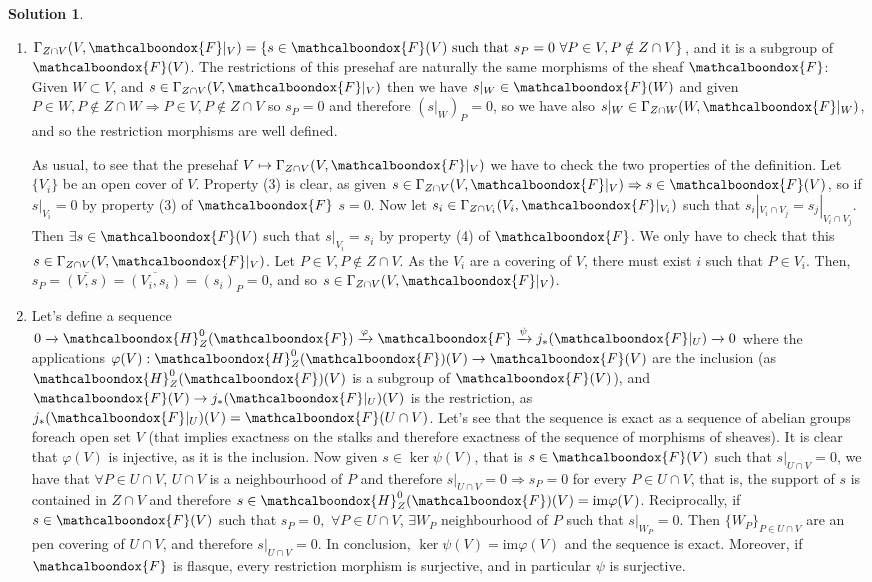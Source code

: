 \documentclass[12pt]{article}
\newcommand{\imp}{\ensuremath{\Rightarrow}}
\newcommand{\ima}{\ensuremath{\mathrm{im}}}
\theoremstyle{definition}
\newtheorem*{sol}{Solution}
\newcommand{\sF}{\ensuremath{\mathcalboondox{F}}}
\newcommand{\sH}{\ensuremath{\mathcalboondox{H}}}
\begin{document}
\begin{sol}
	\begin{enumerate}[label=\alph*)]
		\item $\Gamma_{Z \cap V} (V,\sF|_V) = \{s \in \sF(V) \text{ such that } s_P = 0 \, \, \forall P \in V, P \notin Z \cap V\}$, and it is a subgroup of $\sF(V)$. The restrictions of this presehaf are naturally the same morphisms of the sheaf $\sF$: Given $W \subset V$, and $s \in \Gamma_{Z \cap V} (V,\sF|_V)$ then we have $s|_W \in \sF(W)$ and given $P \in W, P \notin Z \cap W \imp P \in V, P \notin Z \cap V$ so $s_P = 0$ and therefore $(s|_W)_P = 0$, so we have also $s|_W \in \Gamma_{Z \cap W} (W,\sF|_W)$, and so the restriction morphisms are well defined. 

		As usual, to see that the presehaf $V \mapsto \Gamma_{Z \cap V} (V,\sF|_V)$ we have to check the two properties of the definition. Let $\{V_i\}$ be an open cover of $V$. Property (3) is clear, as given $s \in \Gamma_{Z \cap V} (V,\sF|_V) \imp s \in \sF(V)$, so if $s|_{V_i} = 0$ by property (3) of $\sF$ $s = 0$. Now let $s_i \in \Gamma_{Z \cap V_i} (V_i,\sF|_{V_i})$ such that $s_i|_{V_i \cap V_j} = s_j|_{V_i \cap V_j}$. Then $\exists s \in \sF(V)$ such that $s|_{V_i} = s_i$ by property (4) of $\sF$. We only have to check that this $s \in \Gamma_{Z \cap V} (V,\sF|_V)$. Let $P \in V, P \notin Z \cap V$. As the $V_i$ are a covering of $V$, there must exist $i$ such that $P \in V_i$. Then, $s_P = \overline{(V,s)} = \overline{(V_i, s_i)} = (s_i)_P = 0$, and so $s \in \Gamma_{Z \cap V}(V,\sF|_V)$.

		\item Let's define a sequence $0 \xrightarrow[]{} \sH_Z^0(\sF) \xrightarrow[]{\varphi} \sF \xrightarrow[]{\psi} j_*(\sF|_U) \xrightarrow[]{} 0$ where the applications $\varphi(V): \sH_Z^0(\sF)(V) \to \sF(V)$ are the inclusion (as $\sH_Z^0(\sF)(V)$ is a subgroup of $\sF(V)$), and $\sF(V) \to j_*(\sF|_U)(V)$ is the restriction, as $j_*(\sF|_U)(V) = \sF(U \cap V)$. Let's see that the sequence is exact as a sequence of abelian groups foreach open set $V$ (that implies exactness on the stalks and therefore exactness of the sequence of morphisms of sheaves). It is clear that $\varphi(V)$ is injective, as it is the inclusion. Now given $s \in \ker \psi(V)$, that is $s \in \sF(V)$ such that $s|_{U \cap V} = 0$, we have that $\forall P \in U \cap V$, $U \cap V$ is a neighbourhood of $P$ and therefore $s|_{U \cap V} = 0 \imp s_P = 0$ for every $P \in U \cap V$, that is, the support of $s$ is contained in $Z \cap V$ and therefore $s \in \sH^0_{Z}(\sF)(V) = \ima \varphi(V)$. Reciprocally, if $s \in \sF(V)$ such that $s_P = 0, \, \, \forall P \in U \cap V$, $\exists W_P$ neighbourhood of $P$ such that $s|_{W_P} = 0$. Then $\{W_P\}_{P \in U \cap V}$ are an pen covering of $U \cap V$, and therefore $s|_{U \cap V} = 0$. In conclusion, $\ker \psi(V) = \ima \varphi(V)$ and the sequence is exact. Moreover, if $\sF$ is flasque, every restriction morphism is surjective, and in particular $\psi$ is surjective.
	\end{enumerate}
\end{sol}
\end{document}
